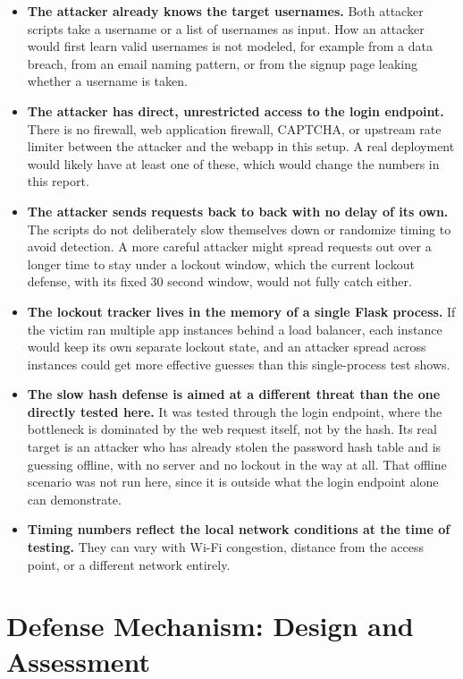 \documentclass[11pt]{article}
\begin{document}
\begin{itemize}[leftmargin=*]
  \item \textbf{The attacker already knows the target usernames.} Both
    attacker scripts take a username or a list of usernames as input. How
    an attacker would first learn valid usernames is not modeled, for
    example from a data breach, from an email naming pattern, or from the
    signup page leaking whether a username is taken.
  \item \textbf{The attacker has direct, unrestricted access to the login
    endpoint.} There is no firewall, web application firewall, CAPTCHA, or
    upstream rate limiter between the attacker and the webapp in this setup.
    A real deployment would likely have at least one of these, which would
    change the numbers in this report.
  \item \textbf{The attacker sends requests back to back with no delay of
    its own.} The scripts do not deliberately slow themselves down or
    randomize timing to avoid detection. A more careful attacker might
    spread requests out over a longer time to stay under a lockout window,
    which the current lockout defense, with its fixed 30 second window,
    would not fully catch either.
  \item \textbf{The lockout tracker lives in the memory of a single Flask
    process.} If the victim ran multiple app instances behind a load
    balancer, each instance would keep its own separate lockout state, and
    an attacker spread across instances could get more effective guesses
    than this single-process test shows.
  \item \textbf{The slow hash defense is aimed at a different threat than
    the one directly tested here.} It was tested through the login endpoint,
    where the bottleneck is dominated by the web request itself, not by the
    hash. Its real target is an attacker who has already stolen the
    password hash table and is guessing offline, with no server and no
    lockout in the way at all. That offline scenario was not run here,
    since it is outside what the login endpoint alone can demonstrate.
  \item \textbf{Timing numbers reflect the local network conditions at the
    time of testing.} They can vary with Wi-Fi congestion, distance from
    the access point, or a different network entirely.
\end{itemize}

\section{Defense Mechanism: Design and Assessment}
\label{sec:defense}
\end{document}
